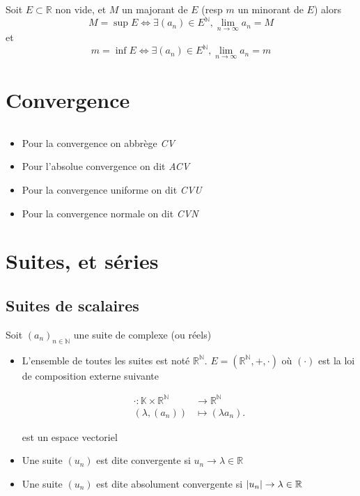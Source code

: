 \documentclass[11pt,colorlinks]{book}
\theoremstyle{mytheoremstyle}
\theoremstyle{mytheoremstyle}
\theoremstyle{mytheoremstyle}
\theoremstyle{mytheoremstyle}
\theoremstyle{mytheoremstyle}
\theoremstyle{mytheoremstyle}
\theoremstyle{mytheoremstyle}
\theoremstyle{mytheoremstyle}
\theoremstyle{myproblemstyle}
\def\mbb#1{\mathbb{#1}}
\def\bN{\mbb{N}}
\def\bR{\mbb{R}}
\def\bK{\mbb{K}}
\def\ln{\lim_{n \to \infty}}
\def\rN{\bR^{\bN}}
\newcommand{\vfunc}[5]{
  \begin{align*}
    #1 \colon #2 &\to #3\\
    #4 &\mapsto #5.
  \end{align*}
}
\begin{document}
\begin{theorem}
  Soit $E \subset \bR$ non vide, et $M$ un majorant de $E$ (resp $m$ un minorant de $E$) alors 
  \begin{equation*}
    M = \sup E \Leftrightarrow \exists (a_n) \in E^{\bN}, \ln a_n = M
  \end{equation*}
  et 
  \begin{equation*}
    m = \inf E \Leftrightarrow \exists (a_n) \in E^{\bN}, \ln a_n = m
  \end{equation*}
\end{theorem}
\section{Convergence}
\begin{rmq}
  $ $
  \begin{itemize}
    \item Pour la convergence on abbrège \textit{CV} 
    \item Pour l'absolue convergence on dit \textit{ACV} 
    \item Pour la convergence uniforme on dit \textit{CVU} 
    \item Pour la convergence normale on dit \textit{CVN}
  \end{itemize}
\end{rmq}
\section{Suites, et séries}
\subsection{Suites de scalaires}
\begin{rmq}
  Soit $(a_n)_{n\in\bN}$ une suite de complexe (ou réels)
  \begin{itemize}
    \item L'ensemble de toutes les suites est noté $\rN$. $E = (\rN,+,\cdot)$ où $(\cdot)$ est la loi de composition externe suivante 
    \vfunc{\cdot}{\bK\times \rN}{\rN}{(\lambda,(a_n))}{(\lambda a_n)}
    est un espace vectoriel
    \item Une suite $(u_n)$ est dite convergente si $u_n \to \lambda \in \bR$ 
    \item Une suite $(u_n)$ est dite absolument convergente si $\abs{u_n} \to \lambda \in \bR$
  \end{itemize}
\end{rmq}
\end{document}
